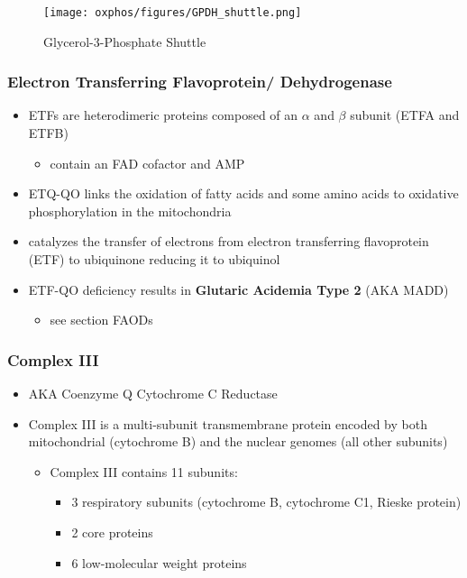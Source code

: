 \documentclass[12pt]{scrartcl}
\begin{document}
\begin{figure}[htbp]
\centering
\texttt{[image: oxphos/figures/GPDH\_shuttle.png]}
\caption[g3ps]{\label{fig:org10ac83a}Glycerol-3-Phosphate Shuttle}
\end{figure}

\subsubsection{Electron Transferring Flavoprotein/ Dehydrogenase}
\label{sec:org847ff1b}
\begin{itemize}
\item ETFs are heterodimeric proteins composed of an \(\alpha\) and \(\beta\)
subunit (ETFA and ETFB)
\begin{itemize}
\item contain an FAD cofactor and AMP
\end{itemize}
\item ETQ-QO links the oxidation of fatty acids and some amino acids to
oxidative phosphorylation in the mitochondria
\item catalyzes the transfer of electrons from electron transferring
flavoprotein (ETF) to ubiquinone reducing it to ubiquinol
\end{itemize}

{\small{}}

\begin{itemize}
\item ETF-QO deficiency results in \textbf{Glutaric Acidemia Type 2} (AKA MADD)
\begin{itemize}
\item see section FAODs
\end{itemize}
\end{itemize}
\subsubsection{Complex III}
\label{sec:org90d5938}
\begin{itemize}
\item AKA Coenzyme Q Cytochrome C Reductase
\item Complex III is a multi-subunit transmembrane protein encoded by both
mitochondrial (cytochrome B) and the nuclear genomes (all other
subunits)

\begin{itemize}
\item Complex III contains 11 subunits:
\begin{itemize}
\item 3 respiratory subunits (cytochrome B, cytochrome C1, Rieske protein)
\item 2 core proteins
\item 6 low-molecular weight proteins
\end{itemize}
\end{itemize}

{\small{}}
\end{itemize}
\end{document}

